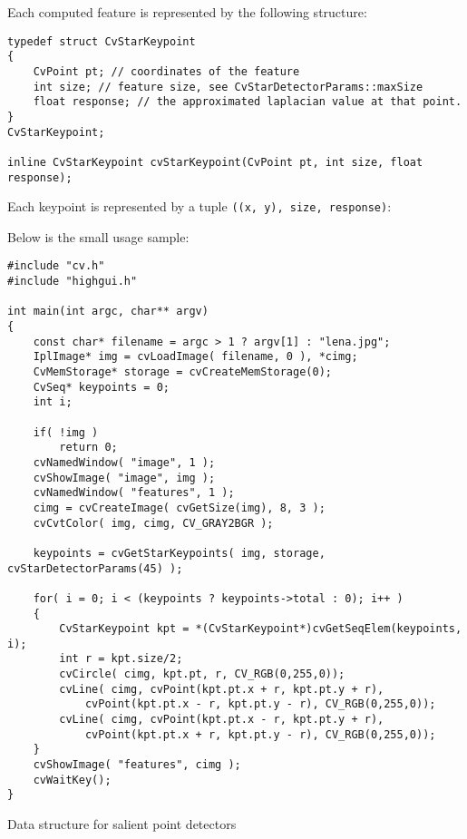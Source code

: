 \ifC
Each computed feature is represented by the following structure:

\begin{lstlisting}
typedef struct CvStarKeypoint
{
    CvPoint pt; // coordinates of the feature
    int size; // feature size, see CvStarDetectorParams::maxSize
    float response; // the approximated laplacian value at that point.
}
CvStarKeypoint;

inline CvStarKeypoint cvStarKeypoint(CvPoint pt, int size, float response);
\end{lstlisting}
\else
Each keypoint is represented by a tuple \texttt{((x, y), size, response)}:
\begin{description}
\end{description}
\fi

\ifC
Below is the small usage sample:

\begin{lstlisting}
#include "cv.h"
#include "highgui.h"

int main(int argc, char** argv)
{
    const char* filename = argc > 1 ? argv[1] : "lena.jpg";
    IplImage* img = cvLoadImage( filename, 0 ), *cimg;
    CvMemStorage* storage = cvCreateMemStorage(0);
    CvSeq* keypoints = 0;
    int i;

    if( !img )
        return 0;
    cvNamedWindow( "image", 1 );
    cvShowImage( "image", img );
    cvNamedWindow( "features", 1 );
    cimg = cvCreateImage( cvGetSize(img), 8, 3 );
    cvCvtColor( img, cimg, CV_GRAY2BGR );

    keypoints = cvGetStarKeypoints( img, storage, cvStarDetectorParams(45) );

    for( i = 0; i < (keypoints ? keypoints->total : 0); i++ )
    {
        CvStarKeypoint kpt = *(CvStarKeypoint*)cvGetSeqElem(keypoints, i);
        int r = kpt.size/2;
        cvCircle( cimg, kpt.pt, r, CV_RGB(0,255,0));
        cvLine( cimg, cvPoint(kpt.pt.x + r, kpt.pt.y + r),
            cvPoint(kpt.pt.x - r, kpt.pt.y - r), CV_RGB(0,255,0));
        cvLine( cimg, cvPoint(kpt.pt.x - r, kpt.pt.y + r),
            cvPoint(kpt.pt.x + r, kpt.pt.y - r), CV_RGB(0,255,0));
    }
    cvShowImage( "features", cimg );
    cvWaitKey();
}
\end{lstlisting}
\fi

\fi
\ifCpp

Data structure for salient point detectors

